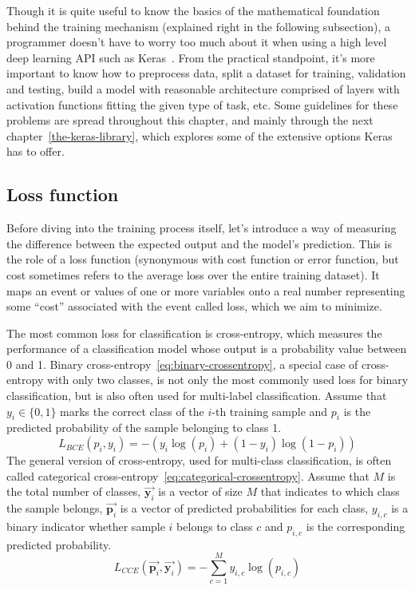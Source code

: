 Though it is quite useful to know the basics of the mathematical foundation behind the training
mechanism (explained right in the following subsection),
a programmer doesn't have to worry too much about it when using a high level
deep learning API such as Keras~\cite{keras-documentation}.
From the practical standpoint, it's more important to know how to
preprocess data, split a dataset for training, validation and testing,
build a model with reasonable architecture comprised of layers
with activation functions fitting the given type of task, etc.
Some guidelines for these problems are spread throughout
this chapter, and mainly through the next chapter~\ref{the-keras-library},
which explores some of the extensive options Keras has to offer.


\subsection*{Loss function}
\label{loss-function}
Before diving into the training process itself, let's introduce a way
of measuring the difference between the expected output and the model's prediction.
This is the role of a loss function (synonymous with cost function or error function,
but cost sometimes refers to the average loss over the entire
training dataset).
It maps an event or values of one or more variables onto a real number representing
some ``cost'' associated with the event called loss, which we aim to minimize.

The most common loss for classification is cross-entropy,
which measures the performance of a classification model whose output is a probability value between 0 and 1.
Binary cross-entropy~\eqref{eq:binary-crossentropy}, a special case of cross-entropy with only two classes,
is not only the most commonly used loss for binary classification,
but is also often used for multi-label classification.
Assume that $y_i \in \{0,1\}$ marks the correct class of the $i$-th training sample and
$p_i$ is the predicted probability of the sample belonging to class 1.
\begin{equation}
\label{eq:binary-crossentropy}
    L_{BCE}(p_i, y_i) = -{(y_i\log(p_i) + (1 - y_i)\log(1 - p_i))}
\end{equation}
The general version of cross-entropy, used for multi-class classification, is often called categorical
cross-entropy~\eqref{eq:categorical-crossentropy}. Assume that $M$ is the total number of classes,
$\vec{\boldsymbol{y}_i}$ is a vector of size $M$ that indicates to which class the sample belongs,
$\vec{\boldsymbol{p}_i}$ is a vector of predicted probabilities for each class,
$y_{i,c}$ is a binary indicator whether sample $i$ belongs to class $c$
and $p_{i,c}$ is the corresponding predicted probability.
\begin{equation}
\label{eq:categorical-crossentropy}
    L_{CCE}(\vec{\boldsymbol{p}_i}, \vec{\boldsymbol{y}_i}) = -\sum_{c=1}^My_{i,c}\log(p_{i,c})
\end{equation}

